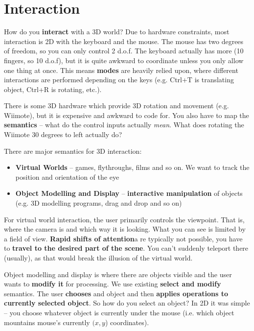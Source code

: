 \documentclass{article}
\begin{document}
\paragraph{}

\section{Interaction}

How do you \textbf{interact} with a 3D world? Due to hardware constraints, most interaction is 2D with the keyboard and the mouse. The mouse has two degrees of freedom, so you can only control 2 d.o.f. The keyboard actually has more (10 fingers, so 10 d.o.f), but it is quite awkward to coordinate unless you only allow one thing at once. This means \textbf{modes} are heavily relied upon, where different interactions are performed depending on the keys (e.g. Ctrl+T is translating object, Ctrl+R is rotating, etc.).

There is some 3D hardware which provide 3D rotation and movement (e.g. Wiimote), but it is expensive and awkward to code for. You also have to map the \textbf{semantics} -- what do the control inputs actually \textit{mean}. What does rotating the Wiimote 30 degrees to left actually do?

There are major semantics for 3D interaction:
\begin{itemize}
	\item \textbf{Virtual Worlds} -- games, flythroughs, films and so on. We want to track the position and orientation of the eye
	\item \textbf{Object Modelling and Display} -- \textbf{interactive manipulation} of objects (e.g. 3D modelling programs, drag and drop and so on)
\end{itemize}

For virtual world interaction, the user primarily controls the viewpoint. That is, where the camera is and which way it is looking. What you can see is limited by a field of view. \textbf{Rapid shifts of attention}a re typically not possible, you have to \textbf{travel to the desired part of the scene}. You can't suddenly teleport there (usually), as that would break the illusion of the virtual world.

Object modelling and display is where there are objects visible and the user wants to \textbf{modify it} for processing. We use existing \textbf{select and modify} semantics. The user \textbf{chooses} and object and then \textbf{applies operations to currently selected object}. So how do you select an object? In 2D it was simple -- you choose whatever object is currently under the mouse (i.e. which object mountains mouse's currently $(x, y$) coordinates).
\end{document}
